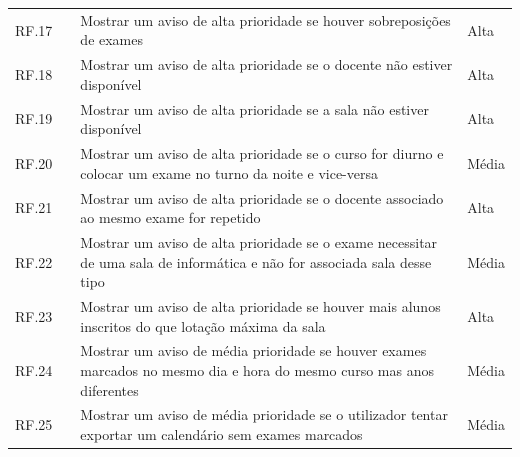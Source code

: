 \documentclass[11pt, twoside]{report}
\begin{document}
\begin{center}
\begin{longtable}{|m{1cm}|m{2.2cm}|m{10cm}|m{2cm}|}
			RF.17           &                                              & Mostrar um aviso de alta prioridade se houver sobreposições de exames                                                    & Alta                \\
			
			RF.18           &                                              & Mostrar um aviso de alta prioridade se o docente não estiver disponível                                                  & Alta                \\
			
			RF.19           &                                              & Mostrar um aviso de alta prioridade se a sala não estiver disponível                                                     & Alta                \\
			
			RF.20           &                                              & Mostrar um aviso de alta prioridade se o curso for diurno e colocar um exame no turno da noite e vice-versa                & Média              \\
			
			RF.21           &                                              & Mostrar um aviso de alta prioridade se o docente associado ao mesmo exame for repetido                                     & Alta                \\
			
			RF.22           &                                              & Mostrar um aviso de alta prioridade se o exame necessitar de uma sala de informática e não for associada sala desse tipo & Média              \\
			
			RF.23           &                                              & Mostrar um aviso de alta prioridade se houver mais alunos inscritos do que  lotação máxima da sala                      & Alta                \\
			
			RF.24           &                                              & Mostrar um aviso de média prioridade se houver exames marcados no mesmo dia e hora do mesmo curso mas anos diferentes     & Média              \\
			\hline
			
			RF.25           &                                              & Mostrar um aviso de média prioridade se o utilizador tentar exportar um calendário sem exames marcados                   & Média              \\
			\hline
			

\end{longtable}
\end{center}
\end{document}
